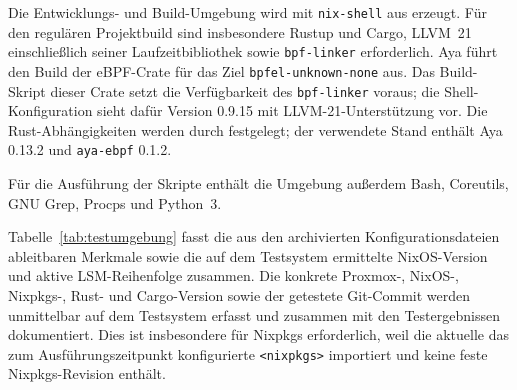 Die Entwicklungs- und Build-Umgebung wird mit \texttt{nix-shell} aus
 erzeugt. Für den regulären Projektbuild sind insbesondere Rustup und
Cargo, LLVM~21 einschließlich seiner Laufzeitbibliothek sowie \texttt{bpf-linker} erforderlich.
Aya führt den Build der eBPF-Crate für das Ziel \texttt{bpfel-unknown-none} aus. Das Build-Skript dieser Crate setzt die Verfügbarkeit des
\texttt{bpf-linker} voraus; die Shell-Konfiguration sieht dafür Version 0.9.15 mit
LLVM-21-Unterstützung vor. Die Rust-Abhängigkeiten werden durch  festgelegt; der
verwendete Stand enthält Aya 0.13.2 und \texttt{aya-ebpf} 0.1.2.

Für die Ausführung der Skripte enthält die Umgebung außerdem Bash, Coreutils, GNU Grep, Procps und
Python~3.

Tabelle~\ref{tab:testumgebung} fasst die aus den archivierten Konfigurationsdateien ableitbaren
Merkmale sowie die auf dem Testsystem ermittelte NixOS-Version und aktive LSM-Reihenfolge
zusammen. Die konkrete Proxmox-, NixOS-, Nixpkgs-, Rust- und Cargo-Version sowie der
getestete Git-Commit werden unmittelbar auf dem Testsystem erfasst und zusammen mit den
Testergebnissen dokumentiert. Dies ist insbesondere für Nixpkgs erforderlich, weil die aktuelle
 das zum Ausführungszeitpunkt konfigurierte \texttt{<nixpkgs>}
importiert und keine feste Nixpkgs-Revision enthält.

